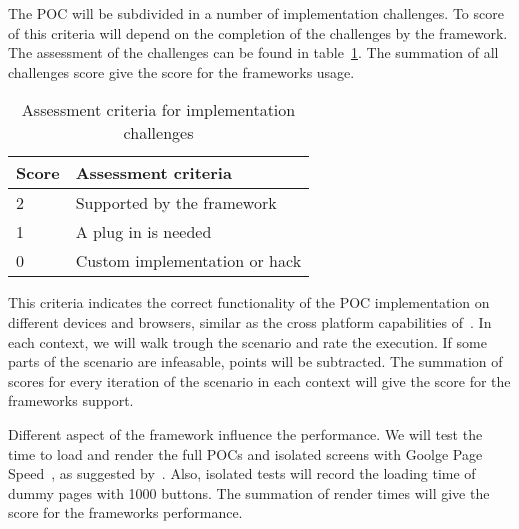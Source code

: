 \documentclass[a4paper]{artikel3}
\renewcommand{\paragraph}[1]{\vspace{2mm} \noindent {\bf #1}  }
\begin{document}
\paragraph{Usage}%
The POC will be subdivided in a number of implementation challenges.  To score of this criteria will depend on the completion of the challenges by the framework.  The assessment of the challenges can be found in table~\ref{table:challenges-scores}.  The summation of all challenges score give the score for the frameworks usage.

\begin{table}[h]
\centering
\begin{tabular}{l|l}
\textbf{Score} & \textbf{Assessment criteria}\\
  \hline \hline
2 & Supported by the framework\\
1 & A plug in is needed\\
0 & Custom implementation or hack\\
\end{tabular}
\caption{Assessment criteria for implementation challenges}
\label{table:challenges-scores}
\end{table}

\paragraph{Support}%
This criteria indicates the correct functionality of the POC implementation on different devices and browsers,  similar as the cross platform capabilities of~\cite{Sarrafi2012a}.  In each context,  we will walk trough the scenario and rate the execution.  If some parts of the scenario are infeasable,  points will be subtracted.  The summation of scores for every iteration of the scenario in each context will give the score for the frameworks support.

\paragraph{Performance}%
Different aspect of the framework influence the performance.  We will test the time to load and render the full POCs and isolated screens with Goolge Page Speed~\cite{Google2012},  as suggested by~\cite{Morgan2011}.   Also,  isolated tests will record the loading time of dummy pages with 1000 buttons.  The summation of render times will give the score for the frameworks performance.
\end{document}
